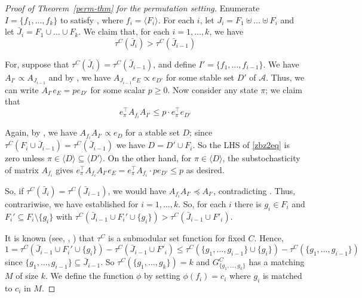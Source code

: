 \documentclass{toc}
\begin{document}
\begin{proof}[Proof of Theorem~\ref{perm-thm} for the permutation setting]
Enumerate $I = \{ f_1, \dots, f_k \}$ to satisfy , where $f_i = \langle F_i \rangle$. For each $i$, let $J_i = F_1 \uplus \dots \uplus F_i$ and let $\bar J_i = F_1 \cup \dots \cup F_k$. We claim that, for each $i = 1, \dots, k$, we have
\begin{equation}
\label{zaz2eq}
\tau^C( \bar J_i) > \tau^C( \bar J_{i-1})
\end{equation}


For, suppose that $\tau^C(\bar J_i) = \tau^C(\bar J_{i-1})$, and define $I' = \{f_1, \dots, f_{i-1} \}$. We have $A_{I'} \propto A_{J_{i-1}}$ and by , we have $A_{J_{i-1}} e_E \propto e_{D'}$ for some stable set $D'$ of $\mathcal A$. Thus, we can write $A_{I'} e_E = p e_{D'}$ for some scalar  $p \geq 0$.  Now consider any state $\pi$; we claim that 
\begin{equation}
\label{zbz2eq}
e_{\pi}^{\top} A_{f_i} A_{I'} \leq p \cdot e_{\pi}^{\top} e_{D'}
\end{equation}

Again, by , we have $A_{f_i} A_{I'} \propto e_D$ for a stable set $D$; since $\tau^C(F_i \cup \bar J_{i-1}) = \tau^C(\bar J_{i-1})$ we have $D = D' \cup F_i$.   So the LHS of \eqref{zbz2eq} is zero unless $\pi \in \langle D \rangle \subseteq \langle D' \rangle$. On the other hand, for $\pi \in \langle D \rangle$, the substochasticity of matrix $A_{f_i}$ gives $  e_{\pi}^{\top} A_{f_i} A_{I'} e_E = e_{\pi}^{\top} A_{f_i} \cdot p e_{D'}  \leq p$  as desired.
  
  So, if $\tau^C(\bar J_i) = \tau^C(\bar J_{i-1})$, we would have $  A_{f_i} A_{I'} \preceq A_{I'}$, contradicting .  Thus, contrariwise, we have established  
 for $i =1, \dots, k$. So,  for each $i$ there is $g_i \in F_i$ and $F_i' \subseteq F_i \setminus \{g_i \}$ with $\tau^C(\bar J_{i-1} \cup F_i' \cup \{g_i \}) > \tau^C(\bar J_{i-1} \cup F'_i)$. 

It is known (see, \eg, \cite[Example 1.4]{lovasz1983}) that $\tau^C$ is a submodular set function for fixed $C$. Hence, 
$$
1 = \tau^C(\bar J_{i-1} \cup F_i' \cup \{g_i \}) - \tau^C(\bar J_{i-1} \cup F'_i) \leq \tau^C(\{g_1, \dots, g_{i-1} \} \cup \{g_i \}) - \tau^C( \{g_1, \dots, g_{i-1} \})
$$
since $\{g_1, \dots, g_{i-1} \} \subseteq \bar J_{i-1}$.  So $\tau^C( \{g_1, \dots, g_k \}) = k$ and $G^C_{ \{ g_1, \dots, g_k \} }$ has a matching $M$ of size $k$.  We define the function $\phi$ by setting $\phi( f_i ) = c_i$ where $g_i$ is matched to $c_i$ in $M$.
\end{proof}
\end{document}
